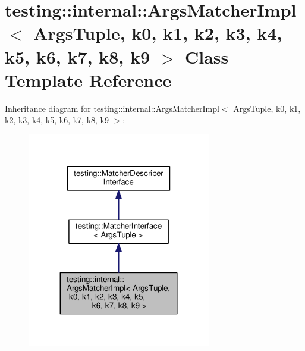 \hypertarget{classtesting_1_1internal_1_1ArgsMatcherImpl}{}\section{testing\+:\+:internal\+:\+:Args\+Matcher\+Impl$<$ Args\+Tuple, k0, k1, k2, k3, k4, k5, k6, k7, k8, k9 $>$ Class Template Reference}
\label{classtesting_1_1internal_1_1ArgsMatcherImpl}


Inheritance diagram for testing\+:\+:internal\+:\+:Args\+Matcher\+Impl$<$ Args\+Tuple, k0, k1, k2, k3, k4, k5, k6, k7, k8, k9 $>$\+:\nopagebreak
\begin{figure}[H]
\begin{center}
\leavevmode
\includegraphics[width=227pt]{classtesting_1_1internal_1_1ArgsMatcherImpl__inherit__graph}
\end{center}
\end{figure}


